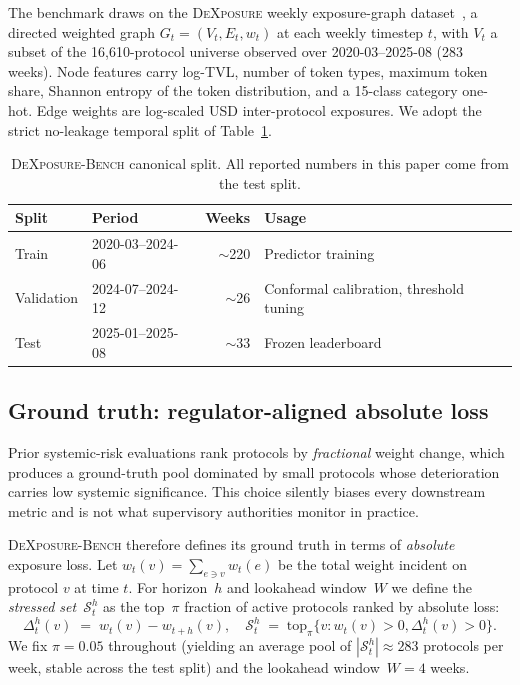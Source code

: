 The benchmark draws on the \textsc{DeXposure} weekly exposure-graph
dataset~\cite{wu2025dexposuredatasetbenchmarksinterprotocol}, a
directed weighted graph $G_t = (V_t, E_t, w_t)$ at each weekly
timestep $t$, with $V_t$ a subset of the 16{,}610-protocol universe
observed over 2020-03--2025-08 (283 weeks).  Node features carry
log-TVL, number of token types, maximum token share, Shannon entropy
of the token distribution, and a 15-class category one-hot.  Edge
weights are log-scaled USD inter-protocol exposures.  We adopt the
strict no-leakage temporal split of Table~\ref{tab:bench-split}.

\begin{table}[t]
\centering
\caption{\textsc{DeXposure-Bench} canonical split.  All reported
numbers in this paper come from the test split.}
\label{tab:bench-split}
\footnotesize
\setlength{\tabcolsep}{6pt}
\begin{tabularx}{\linewidth}{@{}llrX@{}}
\toprule
Split & Period & Weeks & Usage \\
\midrule
Train       & 2020-03--2024-06 & $\sim$220 & Predictor training \\
Validation  & 2024-07--2024-12 & $\sim$26  & Conformal calibration, threshold tuning \\
Test        & 2025-01--2025-08 & $\sim$33  & Frozen leaderboard \\
\bottomrule
\end{tabularx}
\end{table}

\subsection{Ground truth: regulator-aligned absolute loss}
\label{ssec:ground-truth}

Prior systemic-risk evaluations rank protocols by \emph{fractional}
weight change, which produces a ground-truth pool dominated by small
protocols whose deterioration carries low systemic significance.  This
choice silently biases every downstream metric and is not what
supervisory authorities monitor in practice.

\textsc{DeXposure-Bench} therefore defines its ground truth in terms
of \emph{absolute} exposure loss.  Let $w_t(v)=\sum_{e\ni v} w_t(e)$
be the total weight incident on protocol $v$ at time $t$.  For
horizon~$h$ and lookahead window~$W$ we define the \emph{stressed
set}~$\mathcal{S}_t^h$ as the top~$\pi$ fraction of active protocols
ranked by absolute loss:
\begin{equation}
\Delta_t^h(v) \;=\; w_t(v) - w_{t+h}(v),
\quad
\mathcal{S}_t^h \;=\; \mathrm{top}_{\pi}\bigl\{ v : w_t(v) > 0, \Delta_t^h(v) > 0 \bigr\}.
\label{eq:stressed}
\end{equation}
We fix $\pi = 0.05$ throughout (yielding an average pool of
$|\mathcal{S}_t^h|\approx 283$ protocols per week, stable across the
test split) and the lookahead window~$W=4$ weeks.

